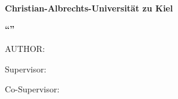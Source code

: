 % 
% 
% 



\thispagestyle{empty}

\setcounter{page}{1}




\begin{center}
    \textbf{{\LARGE {}Christian-Albrechts-Universität zu Kiel}}\\
\end{center}

\vspace*{30mm}

\begin{center}
    \textbf{\large \textsc{{\thesisDegree} }}
\end{center}

\vspace*{0mm}

\begin{center}
    \textbf{\large \thesisType}
\end{center}

\vspace*{10mm}

\begin{center}
    \textbf{{\LARGE {}``\thesisTitle''}}\\
\end{center}

\vspace*{15mm}


\begin{center}
    AUTHOR:
    \par
    \textbf{{\large \thesisAuthor}}
\end{center}


\begin{center}
    \vspace*{1mm}
    Supervisor:
    \par
    \textbf{{\large \thesisProf}}
\end{center}
\begin{center}
    Co-Supervisor:
    \par
    \textbf{{\large \thesisTutor}}
\end{center}

\begin{center}
    \vspace*{1mm}
    {\large \thesisDepartment}
\end{center}

\newpage
\thispagestyle{empty}
\restoregeometry
